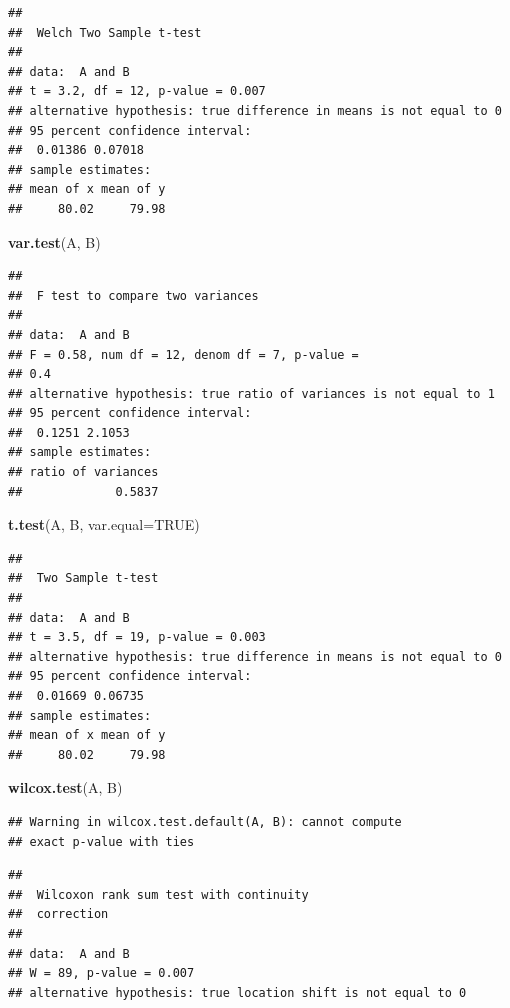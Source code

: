 \documentclass[11pt,]{krantz}
\makeatletter
\newenvironment{Shaded}{\begin{snugshade}}{\end{snugshade}}
\newcommand{\KeywordTok}[1]{\textcolor[rgb]{0.13,0.29,0.53}{\textbf{#1}}}
\newcommand{\DataTypeTok}[1]{\textcolor[rgb]{0.13,0.29,0.53}{#1}}
\newcommand{\OtherTok}[1]{\textcolor[rgb]{0.56,0.35,0.01}{#1}}
\newcommand{\NormalTok}[1]{#1}
\newenvironment{kframe}{%
\medskip{}
\setlength{\fboxsep}{.8em}
 \def\at@end@of@kframe{}%
 \ifinner\ifhmode%
  \def\at@end@of@kframe{\end{minipage}}%
  \begin{minipage}{\columnwidth}%
 \fi\fi%
 \def\FrameCommand##1{\hskip\@totalleftmargin \hskip-\fboxsep
 \colorbox{shadecolor}{##1}\hskip-\fboxsep
     \hskip-\linewidth \hskip-\@totalleftmargin \hskip\columnwidth}%
 \MakeFramed {\advance\hsize-\width
   \@totalleftmargin\z@ \linewidth\hsize
   \@setminipage}}%
 {\par\unskip\endMakeFramed%
 \at@end@of@kframe}
\renewenvironment{Shaded}{\begin{kframe}}{\end{kframe}}
\theoremstyle{definition}
\theoremstyle{definition}
\theoremstyle{remark}
\makeatother
\begin{document}
\begin{verbatim}
## 
##  Welch Two Sample t-test
## 
## data:  A and B
## t = 3.2, df = 12, p-value = 0.007
## alternative hypothesis: true difference in means is not equal to 0
## 95 percent confidence interval:
##  0.01386 0.07018
## sample estimates:
## mean of x mean of y 
##     80.02     79.98
\end{verbatim}

\begin{Shaded}
\begin{Highlighting}[]
\KeywordTok{var.test}\NormalTok{(A, B)}
\end{Highlighting}
\end{Shaded}

\begin{verbatim}
## 
##  F test to compare two variances
## 
## data:  A and B
## F = 0.58, num df = 12, denom df = 7, p-value =
## 0.4
## alternative hypothesis: true ratio of variances is not equal to 1
## 95 percent confidence interval:
##  0.1251 2.1053
## sample estimates:
## ratio of variances 
##             0.5837
\end{verbatim}

\begin{Shaded}
\begin{Highlighting}[]
\KeywordTok{t.test}\NormalTok{(A, B, }\DataTypeTok{var.equal=}\OtherTok{TRUE}\NormalTok{)}
\end{Highlighting}
\end{Shaded}

\begin{verbatim}
## 
##  Two Sample t-test
## 
## data:  A and B
## t = 3.5, df = 19, p-value = 0.003
## alternative hypothesis: true difference in means is not equal to 0
## 95 percent confidence interval:
##  0.01669 0.06735
## sample estimates:
## mean of x mean of y 
##     80.02     79.98
\end{verbatim}

\begin{Shaded}
\begin{Highlighting}[]
\KeywordTok{wilcox.test}\NormalTok{(A, B)}
\end{Highlighting}
\end{Shaded}

\begin{verbatim}
## Warning in wilcox.test.default(A, B): cannot compute
## exact p-value with ties
\end{verbatim}

\begin{verbatim}
## 
##  Wilcoxon rank sum test with continuity
##  correction
## 
## data:  A and B
## W = 89, p-value = 0.007
## alternative hypothesis: true location shift is not equal to 0
\end{verbatim}
\end{document}
